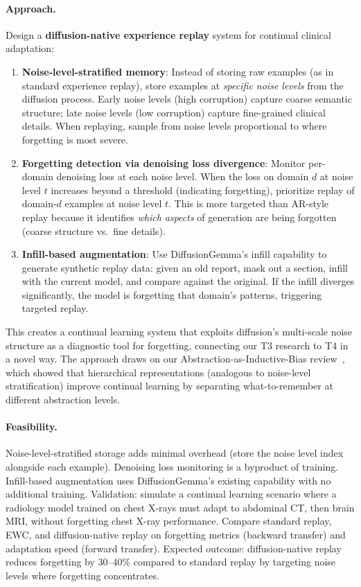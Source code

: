 \documentclass[11pt,a4paper]{article}
\begin{document}
\paragraph{Approach.} Design a \textbf{diffusion-native experience replay} system for continual clinical adaptation:
\begin{enumerate}
\item \textbf{Noise-level-stratified memory}: Instead of storing raw examples (as in standard experience replay), store examples at \emph{specific noise levels} from the diffusion process. Early noise levels (high corruption) capture coarse semantic structure; late noise levels (low corruption) capture fine-grained clinical details. When replaying, sample from noise levels proportional to where forgetting is most severe.
\item \textbf{Forgetting detection via denoising loss divergence}: Monitor per-domain denoising loss at each noise level. When the loss on domain $d$ at noise level $t$ increases beyond a threshold (indicating forgetting), prioritize replay of domain-$d$ examples at noise level $t$. This is more targeted than AR-style replay because it identifies \emph{which aspects} of generation are being forgotten (coarse structure vs.\ fine details).
\item \textbf{Infill-based augmentation}: Use DiffusionGemma's infill capability to generate synthetic replay data: given an old report, mask out a section, infill with the current model, and compare against the original. If the infill diverges significantly, the model is forgetting that domain's patterns, triggering targeted replay.
\end{enumerate}
This creates a continual learning system that exploits diffusion's multi-scale noise structure as a diagnostic tool for forgetting, connecting our T3 research to T4 in a novel way. The approach draws on our Abstraction-as-Inductive-Bias review~\cite{abstraction2026}, which showed that hierarchical representations (analogous to noise-level stratification) improve continual learning by separating what-to-remember at different abstraction levels.

\paragraph{Feasibility.} Noise-level-stratified storage adds minimal overhead (store the noise level index alongside each example). Denoising loss monitoring is a byproduct of training. Infill-based augmentation uses DiffusionGemma's existing capability with no additional training. Validation: simulate a continual learning scenario where a radiology model trained on chest X-rays must adapt to abdominal CT, then brain MRI, without forgetting chest X-ray performance. Compare standard replay, EWC, and diffusion-native replay on forgetting metrics (backward transfer) and adaptation speed (forward transfer). Expected outcome: diffusion-native replay reduces forgetting by 30--40\% compared to standard replay by targeting noise levels where forgetting concentrates.
\end{document}
